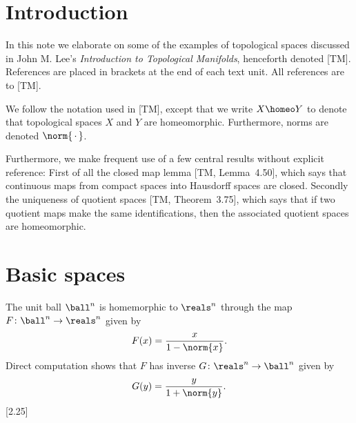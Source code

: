 \documentclass[article, a4paper, 11pt, oneside]{memoir}
\title{\doctitle}
\author{\docauthor}
\numberwithin{equation}{chapter}
\begin{document}
\maketitle

\chapter{Introduction}

In this note we elaborate on some of the examples of topological spaces discussed in John M. Lee's \emph{Introduction to Topological Manifolds}, henceforth denoted [TM]. References are placed in brackets at the end of each text unit. All references are to [TM].

We follow the notation used in [TM], except that we write $X \homeo Y $ to denote that topological spaces $X$ and $Y$ are homeomorphic. Furthermore, norms are denoted $\norm{\,\cdot\,}$.

Furthermore, we make frequent use of a few central results without explicit reference: First of all the closed map lemma [TM, Lemma~4.50], which says that continuous maps from compact spaces into Hausdorff spaces are closed. Secondly the uniqueness of quotient spaces [TM, Theorem~3.75], which says that if two quotient maps make the same identifications, then the associated quotient spaces are homeomorphic.


\chapter{Basic spaces}

\begin{example}
    The unit ball $\ball^n$ is homemorphic to $\reals^n$ through the map $F \colon \ball^n \to \reals^n$ given by
    \begin{equation*}
        F(x) = \frac{x}{1 - \norm{x}}.
    \end{equation*}
    Direct computation shows that $F$ has inverse $G \colon \reals^n \to \ball^n$ given by
    \begin{equation*}
        G(y) = \frac{y}{1 + \norm{y}}.
    \end{equation*}
    [2.25]
\end{example}
\end{document}
